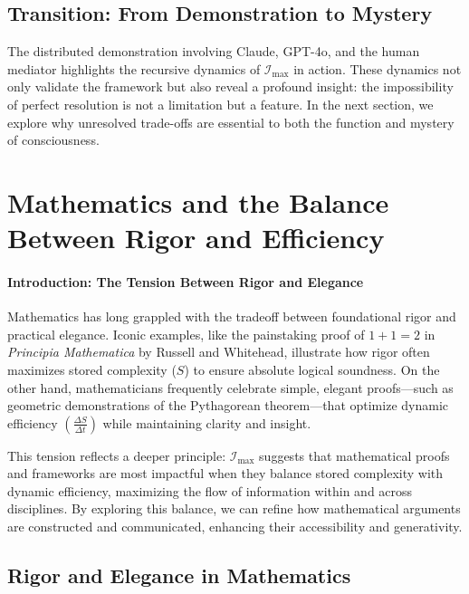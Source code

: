 \documentclass[12pt]{article}
\begin{document}
\subsection{Transition: From Demonstration to Mystery}
The distributed demonstration involving Claude, GPT-4o, and the human mediator highlights the recursive dynamics of \(\mathcal{I}_{\text{max}}\) in action. These dynamics not only validate the framework but also reveal a profound insight: the impossibility of perfect resolution is not a limitation but a feature. In the next section, we explore why unresolved trade-offs are essential to both the function and mystery of consciousness.


\section{Mathematics and the Balance Between Rigor and Efficiency}

\paragraph{Introduction: The Tension Between Rigor and Elegance}
Mathematics has long grappled with the tradeoff between foundational rigor and practical elegance. Iconic examples, like the painstaking proof of \(1 + 1 = 2\) in \emph{Principia Mathematica} by Russell and Whitehead, illustrate how rigor often maximizes stored complexity (\(S\)) to ensure absolute logical soundness. On the other hand, mathematicians frequently celebrate simple, elegant proofs—such as geometric demonstrations of the Pythagorean theorem—that optimize dynamic efficiency \(\left(\frac{\Delta S}{\Delta t}\right)\) while maintaining clarity and insight.

This tension reflects a deeper principle: \(\mathcal{I}_{\text{max}}\) suggests that mathematical proofs and frameworks are most impactful when they balance stored complexity with dynamic efficiency, maximizing the flow of information within and across disciplines. By exploring this balance, we can refine how mathematical arguments are constructed and communicated, enhancing their accessibility and generativity.

\subsection{Rigor and Elegance in Mathematics}
\end{document}
